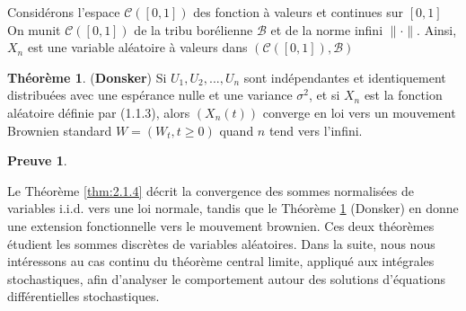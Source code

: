 \documentclass[12pt,a4paper,twoside,fleqn]{book}%
\theoremstyle{definition}
\newtheorem*{pr}{\textbf{Preuve}}
\newtheorem{thm}[dfn]{Théorème}
\theoremstyle{lemme}
\numberwithin{equation}{section}
\begin{document}
Considérons l'espace $\mathcal{C}([0,1])$ des fonction à valeurs et continues sur $[0,1]$ On munit $\mathcal{C}([0,1])$ de la tribu borélienne $\mathcal{B}$ et de la norme infini $\|\cdot\|$. Ainsi, $X_n$ est une variable aléatoire à valeurs dans $(\mathcal{C}([0,1]),\mathcal{B})$

\begin{thm}\label{thm:1.1.8} (\textbf{Donsker})
	Si $U_1, U_2,...,U_n$ sont indépendantes et identiquement distribuées avec une espérance nulle et une variance $\sigma^2$, et si $X_n$ est la fonction aléatoire définie par (1.1.3), alors $(X_n(t))$ converge en loi vers un mouvement Brownien standard $W=(W_t,t\geq0)$ quand $n$ tend vers l'infini. 
\end{thm}
\begin{pr}
	
\end{pr}


Le Théorème \ref{thm:2.1.4} décrit la convergence des sommes normalisées de variables i.i.d. vers une loi normale, tandis que le Théorème \ref{thm:1.1.8} (Donsker) en donne une extension fonctionnelle vers le mouvement brownien. Ces deux théorèmes étudient les sommes discrètes de variables aléatoires. Dans la suite, nous nous intéressons au cas continu du théorème central limite, appliqué aux intégrales stochastiques, afin d’analyser le comportement autour des solutions d’équations différentielles stochastiques.
\end{document}
